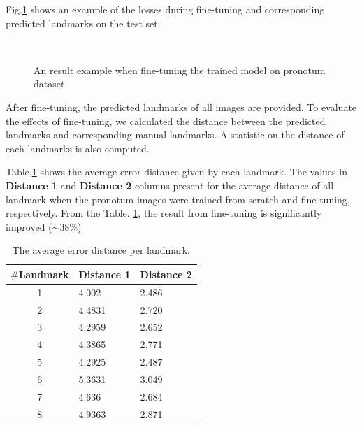 \documentclass[12pt,a4paper]{article}
\begin{document}
Fig.\ref{figfintuning} shows an example of the losses during fine-tuning and corresponding predicted landmarks on the test set.

\begin{figure}[h!]
\centering
{}~~
\caption{An result example when fine-tuning the trained model on pronotum dataset}
\label{figfintuning}
\end{figure}
After fine-tuning, the predicted landmarks of all images are provided. To evaluate the effects of fine-tuning, we calculated the distance between the predicted landmarks and corresponding manual landmarks. A statistic on the distance of each landmarks is also computed. 

Table.\ref{tab2} shows the average error distance given by each landmark. The values in \textbf{Distance 1} and \textbf{Distance 2} columns present for the average distance of all landmark when the pronotum images were trained from scratch and fine-tuning, respectively. From the Table. \ref{tab2}, the result from fine-tuning is significantly improved ($\sim 38\%$) 
\begin{table}[htbp]
\begin{center}
\begin{tabular}{|c|p{2.5cm}|p{2.5cm}|}
\hline
\textbf{$\#$Landmark} & \textbf{Distance 1} & \textbf{Distance 2} \\ \hline
1 & 4.002 & 2.486  \\ \hline
2 & 4.4831 & 2.720  \\ \hline
3 & 4.2959  & 2.652 \\ \hline
4 & 4.3865  & 2.771 \\ \hline
5 & 4.2925  & 2.487 \\ \hline
6 & 5.3631  & 3.049 \\ \hline
7 & 4.636  & 2.684 \\ \hline
8 & 4.9363  & 2.871 \\ \hline
\end{tabular}
\caption{The average error distance per landmark.}
\label{tab2}
\end{center}
\end{table}
\end{document}
